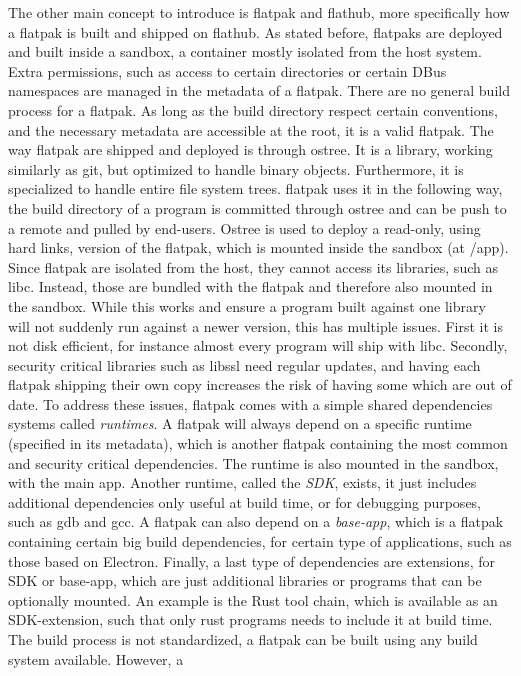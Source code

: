 \documentclass[a4paper,11pt,oneside]{report}
\theoremstyle{definition}
\newcommand{\fp}{flatpak\xspace}
\newcommand{\fh}{flathub\xspace}
\begin{document}
The other main concept to introduce is \fp and \fh, more specifically how a
\fp is built and shipped on \fh. As stated before, flatpaks are deployed and built
inside a sandbox, a container mostly isolated from the host system. Extra
permissions, such as access to certain directories or certain DBus namespaces
are managed in the metadata of a \fp. There are no general build process for a
\fp. As long as the build directory respect certain conventions, and the
necessary metadata are accessible at the root, it is a valid \fp. The way
\fp are shipped and deployed is through ostree. It is a library, working
similarly as git, but optimized to handle binary objects. Furthermore, it is
specialized to handle entire file system trees. \fp uses it in the following
way, the build directory of a program is committed through ostree and can be
push to a remote and pulled by end-users. Ostree is used to deploy a read-only,
using hard links, version of the \fp, which is mounted inside the sandbox (at
/app). Since \fp are isolated from the host, they cannot access its libraries,
such as libc. Instead, those are bundled with the \fp and therefore also mounted
in the sandbox. While this works and ensure a program built against one library
will not suddenly run against a newer version, this has multiple issues. First
it is not disk efficient, for instance almost every program will ship with
libc. Secondly, security critical libraries such as libssl need regular
updates, and having each \fp shipping their own copy increases the risk of
having some which are out of date. To address these issues, \fp comes with a
simple shared dependencies systems called \emph{runtimes}. A \fp will always depend on
a specific runtime (specified in its metadata), which is another \fp
containing the most common and security critical dependencies. The runtime is
also mounted in the sandbox, with the main app. Another runtime, called the
\emph{SDK}, exists, it just includes additional dependencies only useful at build
time, or for debugging purposes, such as gdb and gcc. A \fp can also depend on
a \emph{base-app}, which is a \fp containing certain big build dependencies, for
certain type of applications, such as those based on Electron. Finally, a last
type of dependencies are extensions, for SDK or base-app, which are just
additional libraries or programs that can be optionally mounted. An example is
the Rust tool chain, which is available as an SDK-extension, such that only rust
programs needs to include it at build time. The build process is not
standardized, a \fp can be built using any build system available. However, a
\end{document}
